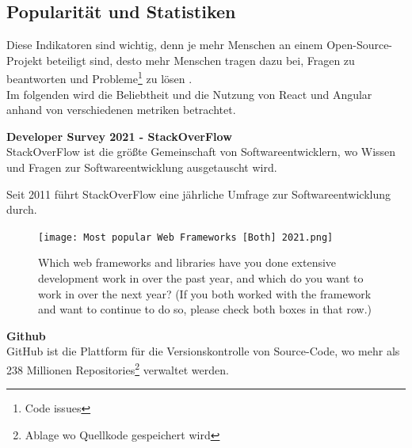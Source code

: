 \newpage
\subsection{Popularität und Statistiken}
Diese Indikatoren sind wichtig, denn je mehr Menschen an einem Open-Source-Projekt beteiligt sind, desto mehr Menschen tragen dazu bei, Fragen zu beantworten und Probleme\footnote{Code issues} zu lösen {\cite{LIN1}}.
\\
Im folgenden wird die Beliebtheit und die Nutzung von React und Angular anhand von verschiedenen metriken betrachtet.

\begin{flushleft}
  \textbf{Developer Survey 2021 - StackOverFlow}\\
  StackOverFlow ist die größte Gemeinschaft von Softwareentwicklern, wo Wissen und Fragen zur Softwareentwicklung ausgetauscht wird.

  Seit 2011 führt StackOverFlow eine jährliche Umfrage zur Softwareentwicklung durch.

  \begin{figure}[h]
    \centering
    \texttt{[image: Most popular Web Frameworks [Both] 2021.png]}
    \caption{ Which web frameworks and libraries have you done extensive development work in over the past year, and which do you want to work in over the next year? (If you both worked with the framework and want to continue to do so, please check both boxes in that row.) {\cite{SO01}}}

  \end{figure}
\end{flushleft}

\newpage

\begin{flushleft}
  \textbf{Github}\\
  GitHub ist die Plattform für die Versionskontrolle von Source-Code, wo mehr als 238 Millionen Repositories\footnote{Ablage wo Quellkode gespeichert wird} verwaltet werden{\cite{GH07}}.
\end{flushleft}

